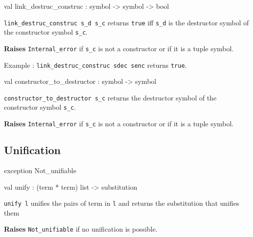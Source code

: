 \label{val:Term.link-underscoredestruc-underscoreconstruc}\begin{ocamldoccode}
val link_destruc_construc : symbol -> symbol -> bool
\end{ocamldoccode}
\begin{ocamldocdescription}
{\tt{link\_destruc\_construc s\_d s\_c}} returns {\tt{true}} iff {\tt{s\_d}} is the destructor symbol of the constructor symbol {\tt{s\_c}}.

{\bf Raises} {\tt{Internal\_error}} if {\tt{s\_c}} is not a constructor or if it is a tuple symbol.


    Example : {\tt{link\_destruc\_construc sdec senc}} returns {\tt{true}}.


\end{ocamldocdescription}




\label{val:Term.constructor-underscoreto-underscoredestructor}\begin{ocamldoccode}
val constructor_to_destructor : symbol -> symbol
\end{ocamldoccode}
\begin{ocamldocdescription}
{\tt{constructor\_to\_destructor s\_c}} returns the destructor symbol of the constructor symbol {\tt{s\_c}}.

{\bf Raises} {\tt{Internal\_error}} if {\tt{s\_c}} is not a constructor or if it is a tuple symbol.


\end{ocamldocdescription}




\subsection{Unification}




\label{exception:Term.Not-underscoreunifiable}\begin{ocamldoccode}
exception Not_unifiable
\end{ocamldoccode}




\label{val:Term.unify}\begin{ocamldoccode}
val unify : (term * term) list -> substitution
\end{ocamldoccode}
\begin{ocamldocdescription}
{\tt{unify l}} unifies the pairs of term in {\tt{l}} and returns the substitution that unifies them

{\bf Raises} {\tt{Not\_unifiable}} if no unification is possible.


\end{ocamldocdescription}




